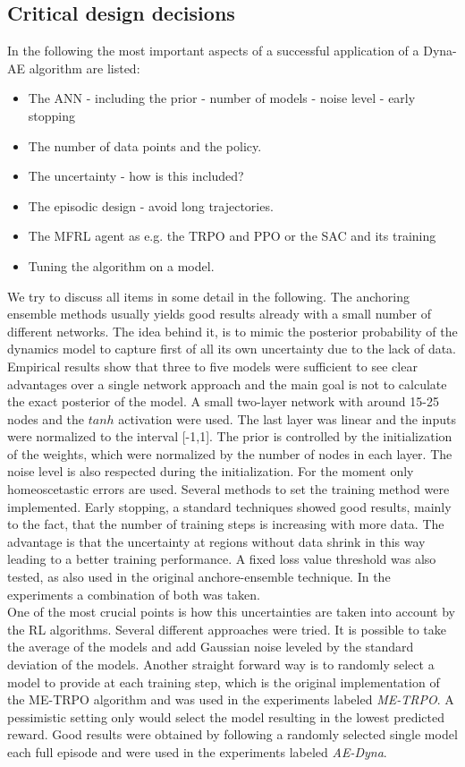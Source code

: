 \documentclass[
 reprint,
 amsmath,amssymb,amsfonts,clevref,
 aps,
prstab,
]{revtex4-2}
\begin{document}
\subsection{Critical design decisions}\label{ss:critical_design}
In the following the most important aspects of a successful application of a Dyna-AE algorithm are listed:
\begin{itemize}
	\item The ANN - including the prior - number of models - noise level - early stopping
	\item The number of data points and the policy.
	\item The uncertainty - how is this included?
	\item The episodic design - avoid long trajectories.
	\item The MFRL agent as e.g. the TRPO and PPO or the SAC and its training
	\item Tuning the algorithm on a model.
\end{itemize}
We try to discuss all items in some detail in the following.
The anchoring ensemble methods usually yields good results already with a small number of different networks. The idea behind it, is to mimic the posterior probability of the dynamics model to capture first of all its own uncertainty due to the lack of data. Empirical results show that three to five models were sufficient to see clear advantages over a single network approach and the main goal is not to calculate the exact posterior of the model. A small two-layer network with around 15-25 nodes and the $tanh$ activation were used. The last layer was linear and the inputs were normalized to the interval [-1,1]. The prior is controlled by the initialization of the weights, which were normalized by the number of nodes in each layer. The noise level is also respected during the initialization. For the moment only homeoscetastic errors are used. Several methods to set the training method were implemented. Early stopping, a standard techniques showed good results, mainly to the fact, that the number of training steps is increasing with more data. The advantage is that the uncertainty at regions without data shrink in this way leading to a better training performance. A fixed loss value threshold was also tested, as also used in the original anchore-ensemble technique. In the experiments a combination of both was taken.\\
One of the most crucial points is how this uncertainties are taken into account by the RL algorithms. Several different approaches were tried. It is possible to take the average of the models and add Gaussian noise leveled by the standard deviation of the models. Another straight forward way is to randomly select a model to provide at each training step, which is the original implementation of the ME-TRPO algorithm and was used in the experiments labeled \emph{ME-TRPO}. A pessimistic setting only would select the model resulting in the lowest predicted reward. Good results were obtained by following a randomly selected single model each full episode and were used in the experiments labeled \emph{AE-Dyna}.\\
\end{document}
